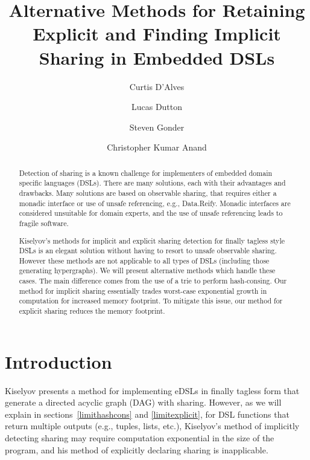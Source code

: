 \documentclass[runningheads]{llncs}
\begin{document}
\lstset{language=haskell}
%
\title{Alternative Methods for Retaining
    Explicit and Finding Implicit Sharing in Embedded DSLs}
%
%
\author{Curtis D'Alves \and
Lucas Dutton \and
Steven Gonder \and
Christopher Kumar Anand
}
%
%
%
\maketitle              %
%
\begin{abstract}
  Detection of sharing is a known challenge for implementers of embedded domain
  specific languages (DSLs). There are many solutions, each with their
  advantages and drawbacks. Many solutions are based on observable sharing, that
  requires either a monadic interface or use of unsafe referencing, e.g.,
  Data.Reify. Monadic interfaces are considered unsuitable for domain experts, and
  the use of unsafe referencing leads to fragile software.

  Kiselyov's methods for implicit and explicit sharing detection for finally
  tagless style DSLs is an elegant solution without having to resort to unsafe
  observable sharing. However these methods are not applicable to all types of
  DSLs (including those generating hypergraphs). We will present alternative
  methods which handle these cases. The main difference comes from the use of a
  trie to perform hash-consing. Our method for implicit sharing essentially
  trades worst-case exponential growth in computation for increased memory
  footprint. To mitigate this issue, our method for explicit sharing reduces the
  memory footprint.

\end{abstract}
%
%
%
\section{Introduction}

Kiselyov \cite{kiselyov:sharing} presents a method for implementing eDSLs in
finally tagless form that generate a directed acyclic graph (DAG) with sharing.
However, as we will explain in sections~\ref{limithashcons} and
\ref{limitexplicit}, for DSL functions that return multiple outputs (e.g.,
tuples, lists, etc.), Kiselyov's method of implicitly detecting sharing may
require computation exponential in the size of the program, and his method of
explicitly declaring sharing is inapplicable.
\end{document}
